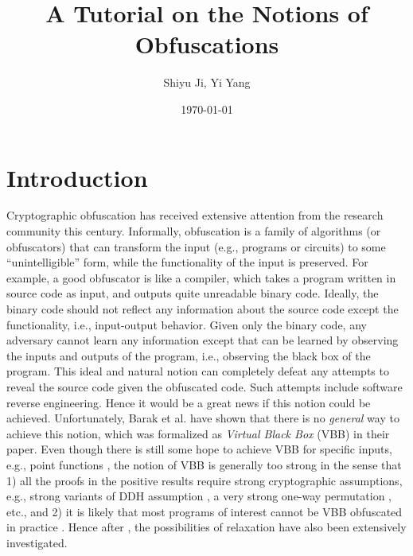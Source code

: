 \documentclass[12pt]{article}
\newcommand{\heading}[5]{
   \renewcommand{\thepage}{#1-\arabic{page}}
   \noindent
   \begin{center}
   \framebox[\textwidth]{
     \begin{minipage}{0.9\textwidth} \onehalfspacing
       {\bf CS 290G -- Introduction to Modern Cryptography} \hfill #2

       {\centering \Large #5
       
       }\medskip

       {\it #3 \hfill #4}
     \end{minipage}
   }
   \end{center}
}
\newcommand{\handout}[3]{\heading{#1}{#2}{Instructor:
Stefano Tessaro}{Student: Shiyu Ji, Yi Yang}{A Tutorial on the Notions of Obfuscations}}
\theoremstyle{definition}
\begin{document}
\title{A Tutorial on the Notions of Obfuscations}
\author{Shiyu Ji, Yi Yang}
\date{\today}
\maketitle

\section{Introduction}
Cryptographic obfuscation has received extensive attention from the research community this century. Informally, obfuscation is a family of algorithms (or obfuscators) that can transform the input (e.g., programs or circuits) to some ``unintelligible'' form, while the functionality of the input is preserved. For example, a good obfuscator is like a compiler, which takes a program written in source code as input, and outputs quite unreadable binary code. Ideally, the binary code should not reflect any information about the source code except the functionality, i.e., input-output behavior. Given only the binary code, any adversary cannot learn any information except that can be learned by observing the inputs and outputs of the program, i.e., observing the black box of the program. This ideal and natural notion can completely defeat any attempts to reveal the source code given the obfuscated code. Such attempts include software reverse engineering. Hence it would be a great news if this notion could be achieved. Unfortunately, Barak et al. \cite{barak2001possibility} have shown that there is no \emph{general} way to achieve this notion, which was formalized as \emph{Virtual Black Box} (VBB) in their paper. Even though there is still some hope to achieve VBB for specific inputs, e.g., point functions \cite{canetti1997towards, canetti1998perfectly, wee2005obfuscating}, the notion of VBB is generally too strong in the sense that 1) all the proofs in the positive results require strong cryptographic assumptions, e.g., strong variants of DDH assumption \cite{canetti1997towards,canetti1998perfectly}, a very strong one-way permutation \cite{wee2005obfuscating}, etc., and 2) it is likely that most programs of interest cannot be VBB obfuscated in practice \cite{goldwasser2005impossibility}. Hence after \cite{barak2001possibility}, the possibilities of relaxation have also been extensively investigated.
\end{document}
